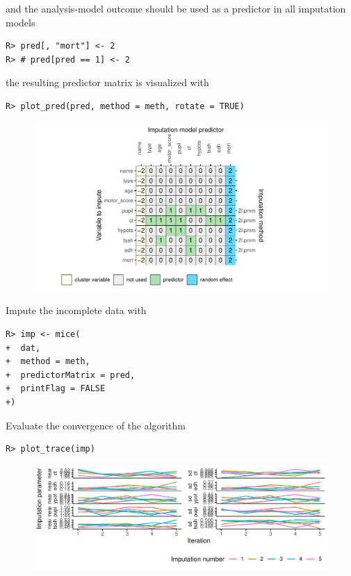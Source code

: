 \documentclass[
  article]{jss}
\begin{document}
and the analysis-model outcome should be used as a predictor in all
imputation models

\begin{verbatim}
R> pred[, "mort"] <- 2
R> # pred[pred == 1] <- 2
\end{verbatim}

the resulting predictor matrix is visualized with

\begin{verbatim}
R> plot_pred(pred, method = meth, rotate = TRUE)
\end{verbatim}

\begin{figure}[h]

{\centering \includegraphics{manuscript_files/figure-pdf/unnamed-chunk-38-1.pdf}

}

\end{figure}

Impute the incomplete data with

\begin{verbatim}
R> imp <- mice(
+  dat,
+  method = meth,
+  predictorMatrix = pred,
+  printFlag = FALSE
+)
\end{verbatim}

Evaluate the convergence of the algorithm

\begin{verbatim}
R> plot_trace(imp)
\end{verbatim}

\begin{figure}[h]

{\centering \includegraphics{manuscript_files/figure-pdf/unnamed-chunk-40-1.pdf}

}

\end{figure}
\end{document}
